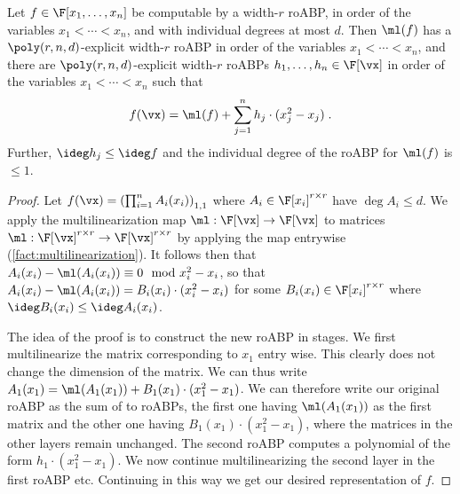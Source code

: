 \documentclass{toc}
\begin{document}
\begin{proposition}\label{res:multilin:roABP}
%
%
Let $f\in\F[x_1,\ldots,x_n]$ be computable by a width-$r$ roABP, in order of the variables $x_1<\cdots<x_n$, and with individual degrees at most $d$. Then $\ml(f)$ has a $\poly(r,n,d)$-explicit width-$r$ roABP in order of the variables $x_1<\cdots<x_n$, and there are $\poly(r,n,d)$-explicit width-$r$ roABPs $h_1,\ldots,h_n\in\F[\vx]$ in order of the variables $x_1<\cdots<x_n$ such that
        \[
                f(\vx)=\ml(f)+\sum_{j=1}^n h_j\cdot (x_j^2-x_j)
                \;.
        \]
        Further, $\ideg h_j\le \ideg f$ and the individual degree of the roABP for $\ml(f)$ is $\le 1$.
\end{proposition}
\begin{proof}
Let  $f(\vx)=\left(\prod_{i=1}^n A_i(x_i)\right)_{1,1}$ where $A_i\in\F[x_i]^{r\times r}$ have $\deg A_i\le d$.
We apply the multilinearization map $\ml:\F[\vx]\to\F[\vx]$ to matrices $\ml:\F[\vx]^{r\times r}\to\F[\vx]^{r\times r}$ by applying the map
%
entrywise   %
(\autoref{fact:multilinearization}).  It follows then that $A_i(x_i)-\ml(A_i(x_i))\equiv 0\mod x_i^2-x_i$, so that $A_i(x_i)-\ml(A_i(x_i))=B_i(x_i)\cdot (x_i^2-x_i)$ for some $B_i(x_i)\in\F[x_i]^{r\times r}$ where $\ideg B_i(x_i)\le \ideg A_i(x_i)$.

The idea of the proof is to construct the new roABP in stages. We first multilinearize the matrix corresponding to $x_1$ entry wise. This clearly does not change the dimension of the matrix. We can thus write $A_1(x_1)=\ml(A_1(x_1))+B_1(x_1)\cdot (x_1^2-x_1)$. We can therefore write our original roABP as the sum of to roABPs, the first one having $\ml(A_1(x_1))$ as the first matrix and the other one having $B_1(x_1)\cdot (x_1^2-x_1)$, where the matrices in the other layers remain unchanged. The second roABP computes a polynomial of the form $h_1\cdot (x_1^2-x_1)$. We now continue multilinearizing the second layer in the first roABP etc. Continuing in this way we get our desired representation of $f$.


\end{proof}
\end{document}
